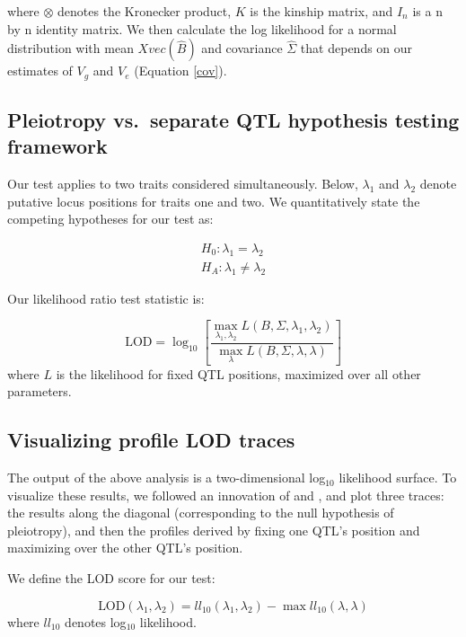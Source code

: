 \documentclass[oneside]{book}\usepackage[]{graphicx}\usepackage[]{color}
\begin{document}
\noindent where $\otimes$ denotes the Kronecker product, $K$ is the
kinship matrix, and $I_n$ is a n by n
identity matrix. We then calculate the log likelihood for a normal
distribution with mean $X vec(\hat B)$ and covariance $\hat \Sigma$
that depends on our estimates of $V_g$ and $V_e$ (Equation \ref{cov}).

\subsection{Pleiotropy vs.\ separate QTL hypothesis testing framework}

Our test applies to two traits considered simultaneously. Below,
$\lambda_1$ and $\lambda_2$ denote putative locus positions for traits
one and two. We quantitatively state the competing hypotheses for our
test as:

\begin{eqnarray}
H_0: \lambda_1 = \lambda_2 \nonumber\\
H_A: \lambda_1 \neq \lambda_2
\label{eqn:hypotheses}
\end{eqnarray}

\noindent Our likelihood ratio test statistic is:

\begin{equation}
\text{LOD} = \log_{10} \left[ \frac{\max_{\lambda_1, \lambda_2} L(B, \Sigma, \lambda_1, \lambda_2)}{
    \max_\lambda L(B, \Sigma, \lambda, \lambda)} \right]
\label{eqn:test-statistic}
\end{equation}
where $L$ is the likelihood for fixed QTL positions,
maximized over all other parameters.

\subsection{Visualizing profile LOD traces}

The output of the above analysis is a two-dimensional log$_{10}$ likelihood
surface. To visualize these results, we followed an innovation of \citet{zeng2000genetic} and
\citet{tian2016dissection}, and plot three traces: the results along the
diagonal (corresponding to the null hypothesis of pleiotropy), and
then the profiles derived by fixing one QTL's position
and maximizing over the other QTL's position.

We define the LOD score for our test:

\begin{equation}
\text{LOD}(\lambda_1, \lambda_2) = ll_{10}(\lambda_1, \lambda_2) - \max ll_{10}(\lambda, \lambda)
\label{eq:lodpvl}
\end{equation}
where $ll_{10}$ denotes log$_{10}$ likelihood.
\end{document}
